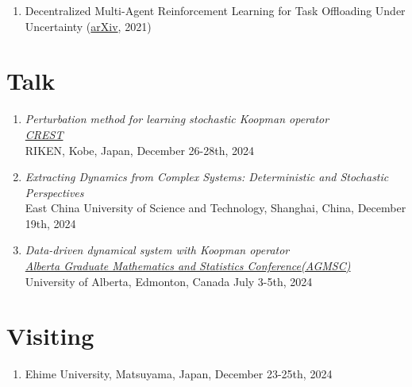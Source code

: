 \documentclass[margin]{res}
\begin{document}
\begin{resume}
\begin{enumerate}
    \item Decentralized Multi-Agent Reinforcement Learning for Task Offloading Under Uncertainty (\href{https://arxiv.org/abs/2107.08114}{arXiv}, 2021)


\end{enumerate}


\section{Talk}
\begin{enumerate}
    \item {\sl Perturbation method for learning stochastic Koopman operator} \\
    \href{https://docs.google.com/spreadsheets/d/1XrgG53J6HlsHYLRHtYFsj5s32eWDr9B_/edit?gid=1512777206#gid=1512777206}{\sl CREST} \\
    RIKEN, Kobe, Japan, December 26-28th, 2024

    \item {\sl Extracting Dynamics from Complex Systems: Deterministic and Stochastic Perspectives} \\
    East China University of Science and Technology, Shanghai, China, December 19th, 2024

    \item {\sl Data-driven dynamical system with Koopman operator} \\    \href{https://docs.google.com/document/d/1oWIKgW8W_qmmOJkUmXaJiKEmhW-mByOP0N44jT0jp18/edit#heading=h.dkxccm7x4lvd}{\sl Alberta Graduate Mathematics and Statistics Conference(AGMSC)} \\
    University of Alberta, Edmonton, Canada July 3-5th, 2024
\end{enumerate}



\section{Visiting}
\begin{enumerate}
    \item Ehime University, Matsuyama, Japan, December 23-25th, 2024
\end{enumerate}



\end{resume}
\end{document}
